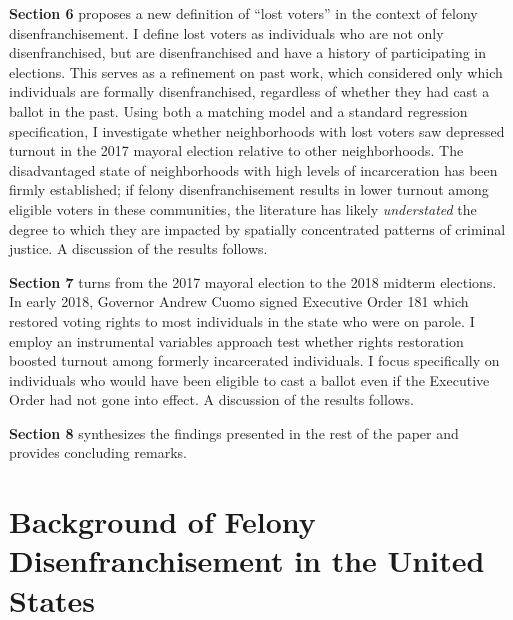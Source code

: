 \documentclass[]{article}
\begin{document}
\textbf{Section 6} proposes a new definition of ``lost voters'' in the context of felony disenfranchisement. I define lost voters as individuals who are not only disenfranchised, but are disenfranchised and have a history of participating in elections. This serves as a refinement on past work, which considered only which individuals are formally disenfranchised, regardless of whether they had cast a ballot in the past. Using both a matching model and a standard regression specification, I investigate whether neighborhoods with lost voters saw depressed turnout in the 2017 mayoral election relative to other neighborhoods. The disadvantaged state of neighborhoods with high levels of incarceration has been firmly established; if felony disenfranchisement results in lower turnout among eligible voters in these communities, the literature has likely \emph{understated} the degree to which they are impacted by spatially concentrated patterns of criminal justice. A discussion of the results follows.

\textbf{Section 7} turns from the 2017 mayoral election to the 2018 midterm elections. In early 2018, Governor Andrew Cuomo signed Executive Order 181 which restored voting rights to most individuals in the state who were on parole. I employ an instrumental variables approach test whether rights restoration boosted turnout among formerly incarcerated individuals. I focus specifically on individuals who would have been eligible to cast a ballot even if the Executive Order had not gone into effect. A discussion of the results follows.

\textbf{Section 8} synthesizes the findings presented in the rest of the paper and provides concluding remarks.

\hypertarget{background-of-felony-disenfranchisement-in-the-united-states}{%
\section{Background of Felony Disenfranchisement in the United States}\label{background-of-felony-disenfranchisement-in-the-united-states}}
\end{document}
